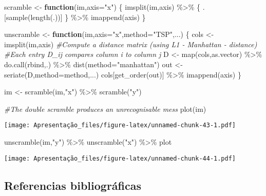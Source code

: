 \documentclass[
]{article}
\newenvironment{Shaded}{\begin{snugshade}}{\end{snugshade}}
\newcommand{\AttributeTok}[1]{\textcolor[rgb]{0.77,0.63,0.00}{#1}}
\newcommand{\CommentTok}[1]{\textcolor[rgb]{0.56,0.35,0.01}{\textit{#1}}}
\newcommand{\ControlFlowTok}[1]{\textcolor[rgb]{0.13,0.29,0.53}{\textbf{#1}}}
\newcommand{\FunctionTok}[1]{\textcolor[rgb]{0.00,0.00,0.00}{#1}}
\newcommand{\NormalTok}[1]{#1}
\newcommand{\OtherTok}[1]{\textcolor[rgb]{0.56,0.35,0.01}{#1}}
\newcommand{\SpecialCharTok}[1]{\textcolor[rgb]{0.00,0.00,0.00}{#1}}
\newcommand{\StringTok}[1]{\textcolor[rgb]{0.31,0.60,0.02}{#1}}
\begin{document}
\begin{Shaded}
\begin{Highlighting}[]
\NormalTok{scramble }\OtherTok{\textless{}{-}} \ControlFlowTok{function}\NormalTok{(im,}\AttributeTok{axis=}\StringTok{"x"}\NormalTok{)}
\NormalTok{\{}
    \FunctionTok{imsplit}\NormalTok{(im,axis) }\SpecialCharTok{\%\textgreater{}\%}\NormalTok{ \{ .[}\FunctionTok{sample}\NormalTok{(}\FunctionTok{length}\NormalTok{(.))] \} }\SpecialCharTok{\%\textgreater{}\%} \FunctionTok{imappend}\NormalTok{(axis) }
\NormalTok{\}}


\NormalTok{unscramble }\OtherTok{\textless{}{-}} \ControlFlowTok{function}\NormalTok{(im,}\AttributeTok{axis=}\StringTok{"x"}\NormalTok{,}\AttributeTok{method=}\StringTok{"TSP"}\NormalTok{,...)}
\NormalTok{\{}
\NormalTok{    cols }\OtherTok{\textless{}{-}} \FunctionTok{imsplit}\NormalTok{(im,axis)}
    \CommentTok{\#Compute a distance matrix (using L1 {-} Manhattan {-} distance)}
    \CommentTok{\#Each entry D\_ij compares column i to column j  }
\NormalTok{    D }\OtherTok{\textless{}{-}} \FunctionTok{map}\NormalTok{(cols,as.vector) }\SpecialCharTok{\%\textgreater{}\%} \FunctionTok{do.call}\NormalTok{(rbind,.) }\SpecialCharTok{\%\textgreater{}\%} \FunctionTok{dist}\NormalTok{(}\AttributeTok{method=}\StringTok{"manhattan"}\NormalTok{)}
\NormalTok{    out }\OtherTok{\textless{}{-}} \FunctionTok{seriate}\NormalTok{(D,}\AttributeTok{method=}\NormalTok{method,...)}
\NormalTok{    cols[}\FunctionTok{get\_order}\NormalTok{(out)] }\SpecialCharTok{\%\textgreater{}\%} \FunctionTok{imappend}\NormalTok{(axis) }
\NormalTok{\}}

\NormalTok{im }\OtherTok{\textless{}{-}} \FunctionTok{scramble}\NormalTok{(im,}\StringTok{"x"}\NormalTok{) }\SpecialCharTok{\%\textgreater{}\%} \FunctionTok{scramble}\NormalTok{(}\StringTok{"y"}\NormalTok{)}

\CommentTok{\#The double scramble produces an unrecognisable mess}
\FunctionTok{plot}\NormalTok{(im)}
\end{Highlighting}
\end{Shaded}

\texttt{[image: Apresentação\_files/figure-latex/unnamed-chunk-43-1.pdf]}

\begin{Shaded}
\begin{Highlighting}[]
\FunctionTok{unscramble}\NormalTok{(im,}\StringTok{"y"}\NormalTok{) }\SpecialCharTok{\%\textgreater{}\%} \FunctionTok{unscramble}\NormalTok{(}\StringTok{"x"}\NormalTok{) }\SpecialCharTok{\%\textgreater{}\%}\NormalTok{ plot}
\end{Highlighting}
\end{Shaded}

\texttt{[image: Apresentação\_files/figure-latex/unnamed-chunk-44-1.pdf]}

\hypertarget{referencias-bibliogruxe1ficas}{%
\subsection{Referencias
bibliográficas}\label{referencias-bibliogruxe1ficas}}
\end{document}
